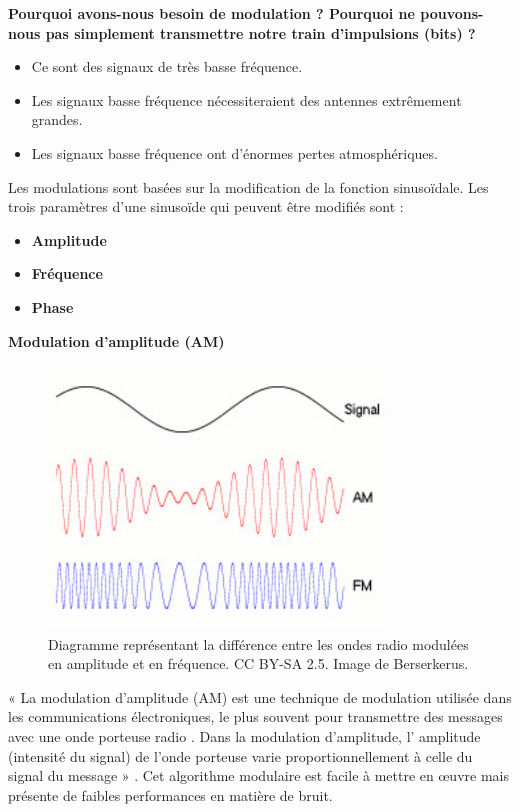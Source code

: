 \textbf{Pourquoi avons-nous besoin de modulation ? Pourquoi ne pouvons-nous pas simplement transmettre notre train d'impulsions (bits) ?}
\begin{itemize}
    \item Ce sont des signaux de très basse fréquence.
    \item Les signaux basse fréquence nécessiteraient des antennes extrêmement grandes.
    \item Les signaux basse fréquence ont d'énormes pertes atmosphériques.
\end{itemize}
\vspace{0.5cm}
Les modulations sont basées sur la modification de la fonction sinusoïdale.  
Les trois paramètres d'une sinusoïde qui peuvent être modifiés sont :
\begin{itemize}
    \item \textbf{Amplitude}
    \item \textbf{Fréquence}
    \item \textbf{Phase}
\end{itemize}
\textbf{Modulation d'amplitude (AM)}
\begin{figure}[H] %
    \centering
    \includegraphics[width=0.8\textwidth]{figures/Amfm3-en-de-0003.jpg}
    \caption{Diagramme représentant la différence entre les ondes radio modulées en amplitude et en fréquence. CC BY-SA 2.5. Image de Berserkerus. }
    \label{fig:communication2}
\end{figure}
« La modulation d'amplitude (AM) est une technique de modulation utilisée dans les communications électroniques, le plus souvent pour transmettre des messages avec une onde porteuse radio . Dans la modulation d'amplitude, l' amplitude (intensité du signal) de l'onde porteuse varie proportionnellement à celle du signal du message » . Cet algorithme modulaire est facile à mettre en œuvre mais présente de faibles performances en matière de bruit.
